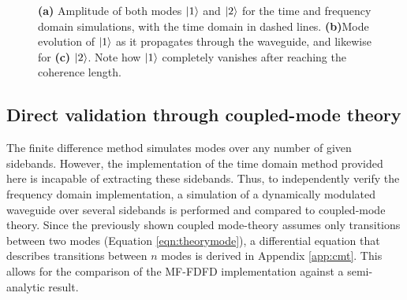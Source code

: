 \begin{figure}[t]
	\centering
	\begin{subfigure}{\textwidth}
		\centering
		\setlength{\figH}{0.3\textwidth}
		\setlength{\figW}{\textwidth}
		
		\label{sfig:coherence}%
	\end{subfigure}
	\setlength{\figH}{0.3\textwidth}
	\setlength{\figW}{0.4\textwidth}
	\begin{subfigure}{0.5\textwidth}
		\centering
		
		\label{sfig:mode1}%
	\end{subfigure}%
	\begin{subfigure}{0.5\textwidth}
		\centering
		
		\label{sfig:mode2}%
	\end{subfigure}
	\caption[Comparison of mode transition for FDTD and FDFD]{\textbf{(a)} Amplitude of both modes $\ket{1}$ and $\ket{2}$ for the time and frequency domain simulations, with the time domain in dashed lines. \textbf{(b)}Mode evolution of $\ket{1}$ as it propagates through the waveguide, and likewise for \textbf{(c)} $\ket{2}$. Note how $\ket{1}$ completely vanishes after reaching the coherence length.}
	\label{fig:coherencelength}
\end{figure} 


\subsection{Direct validation through coupled-mode theory}

The finite difference method simulates modes over any number of given sidebands. However, the implementation of the time domain method provided here is incapable of extracting these sidebands. Thus, to independently verify the frequency domain implementation, a simulation of a dynamically modulated waveguide over several sidebands is performed and compared to coupled-mode theory. Since the previously shown coupled mode-theory assumes only transitions between two modes (Equation \ref{eqn:theorymode}), a differential equation that describes transitions between $n$ modes is derived in Appendix \ref{app:cmt}. This allows for the comparison of the MF-FDFD implementation against a semi-analytic result.

